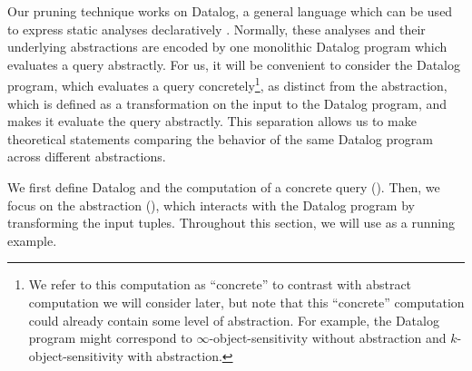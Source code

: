 
Our pruning technique works on Datalog, a general language which can be used to
express static analyses declaratively \cite{Whaley2007,bravenboer}.  Normally,
these analyses and their underlying abstractions are encoded by one monolithic Datalog program
which evaluates a query abstractly.
For us, it will be convenient to consider the
Datalog program, which evaluates a query concretely\footnote{We refer to this computation as ``concrete''
to contrast with abstract computation we will consider later,
but note that this ``concrete'' computation
could already contain some level of abstraction.
For example, the Datalog program might correspond to $\infty$-object-sensitivity
without abstraction and $k$-object-sensitivity with abstraction.
}, as distinct
from the abstraction, which is defined as a transformation on the input to
the Datalog program, and makes it evaluate the query abstractly.  This separation
allows us to make theoretical statements
comparing the behavior of the same Datalog program across different
abstractions.

We first define Datalog and the computation of a concrete query
().  Then, we focus on the abstraction (),
which interacts with the Datalog program by transforming the input tuples.
Throughout this section, we will use  as a running example.

